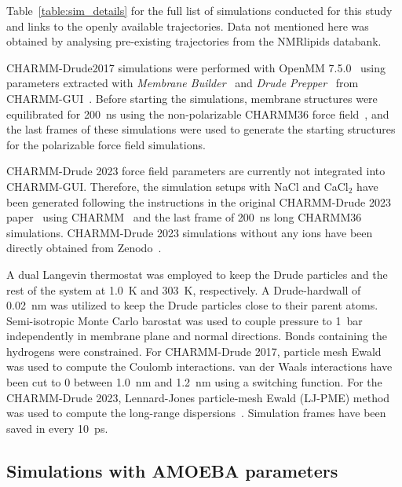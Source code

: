 \documentclass[journal=jacsat,manuscript=article,layout=singlecolumn]{achemso}
\begin{document}
Table~\ref{table:sim_details} for the full list of simulations conducted for this study and links to the openly available trajectories. Data not mentioned here was obtained by analysing pre-existing trajectories from the NMRlipids databank.


CHARMM-Drude2017 simulations were performed with OpenMM 7.5.0~\cite{eastman2017openmm} using parameters extracted with \textit{Membrane Builder}~\cite{wu2014charmm,jo2009charmm,jo2007automated,lee2018charmm} and \textit{Drude Prepper}~\cite{kognole2022charmm} from CHARMM-GUI~\cite{jo2008charmm,lee2016charmm}. Before starting the simulations, membrane structures were equilibrated for 200~ns using the non-polarizable CHARMM36 force field~\cite{klauda2010update}, and the last frames of these simulations were used to generate the starting structures for the polarizable force field simulations.

CHARMM-Drude 2023 force field parameters are currently not integrated into CHARMM-GUI. Therefore, the simulation setups with NaCl and CaCl$_{2}$ have been generated following the instructions in the original CHARMM-Drude 2023 paper~\cite{yu2023drude} using CHARMM~\cite{brooks2009charmm} and the last frame of 200~ns long CHARMM36 simulations. CHARMM-Drude 2023 simulations without any ions have been directly obtained from Zenodo~\cite{richard_m_venable_2023_7872447, richard_m_venable_2023_7871949}. 

A dual Langevin thermostat was employed to keep the Drude particles and the rest of the system at 1.0~K and 303~K, respectively. A Drude-hardwall of 0.02~nm was utilized to keep the Drude particles close to their parent atoms. Semi-isotropic Monte Carlo barostat was used to couple pressure to 1~bar independently in membrane plane and normal directions. %
Bonds containing the hydrogens were constrained. For CHARMM-Drude 2017, particle mesh Ewald was used to compute the Coulomb interactions. van der Waals interactions have been cut to 0 between 1.0~nm and 1.2~nm using a switching function. For the CHARMM-Drude 2023, Lennard-Jones particle-mesh Ewald (LJ-PME) method was used to compute the long-range dispersions~\cite{wennberg2013lennard}. Simulation frames have been saved in every 10~ps.


\subsection{Simulations with AMOEBA parameters}
\end{document}
